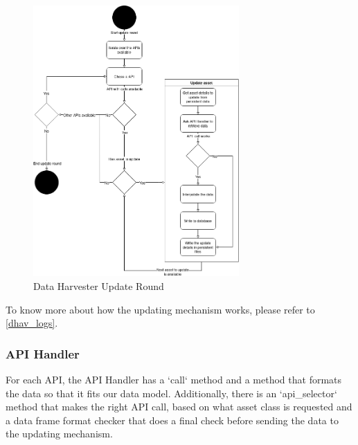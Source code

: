 \documentclass[main.tex]{subfiles}
\begin{document}
\begin{figure}[H]
    \centering
    \includegraphics[width=0.7\textwidth]{04Design/04Pictures/update_mechanism_flow_chart.png}
    \caption{Data Harvester Update Round \cite{TR}}
\end{figure}
To know more about how the updating mechanism works, please refer to \ref{dhav_logs}.

\subsubsection{API Handler}

For each API, the API Handler has a `call` method and a method that formats the data so that it fits our data model. Additionally, there is an `api\_selector` method that makes the right API call, based on what asset class is requested and a data frame format checker that does a final check before sending the data to the updating mechanism. 
\end{document}
